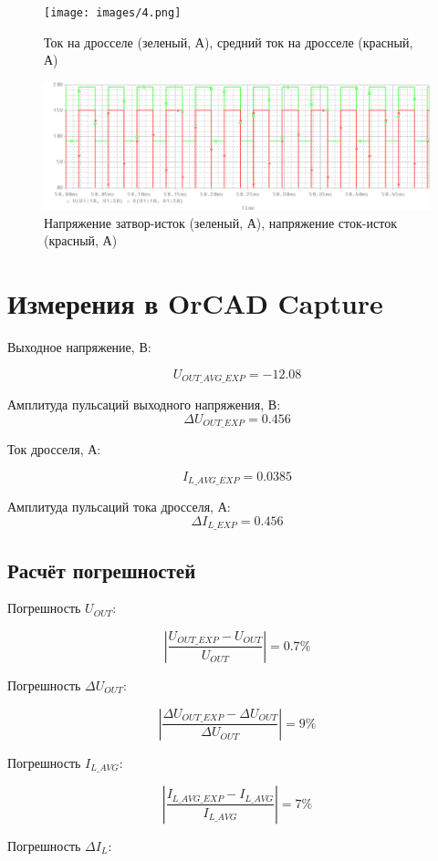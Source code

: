 \begin{figure}[h!]
	\centering
	\caption{Ток на дросселе (зеленый, А), средний ток на дросселе (красный, А)}
	\texttt{[image: images/4.png]}
\end{figure}

\begin{figure}[h!]
	\centering
	\caption{Напряжение затвор-исток (зеленый, А), напряжение сток-исток (красный, А) }
	\includegraphics{images/5.png}
\end{figure}



\chapter{Измерения в OrCAD Capture}

Выходное напряжение, В:   				           

\[
U_{OUT\_AVG\_EXP}=-12.08
\]

Амплитуда пульсаций выходного напряжения, В:	
\[
\Delta U_{OUT\_EXP}=0.456
\]

Ток дросселя, А:	
		        				
\[
I_{L\_AVG\_EXP}=0.0385 
\]

Амплитуда пульсаций тока дросселя, А:			
\[
\Delta I_{L\_EXP}=0.456
\]


\section{Расчёт погрешностей}

Погрешность $U_{OUT}$:

\[
\left| \frac{U_{OUT\_EXP}-U_{OUT}}{U_{OUT}}\right|=0.7\%
\]


Погрешность $\Delta U_{OUT}$:

\[
\left| \frac{\Delta U_{OUT\_EXP}-\Delta U_{OUT}}{\Delta U_{OUT}}\right|=9 \%
\]

Погрешность $I_{L\_AVG}$:

\[
\left| \frac{I_{L\_AVG\_EXP}-I_{L\_AVG}}{I_{L\_AVG}} \right|=7 \%
\]

Погрешность $\Delta I_L$:

